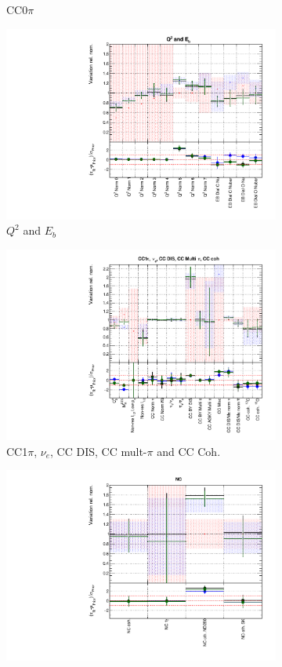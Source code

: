 \begin{figure}[!htbp]
\begin{subfigure}{0.49\textwidth}
  \caption{CC0$\pi$}
\end{subfigure}
\begin{subfigure}{0.49\textwidth}
  \centering
  \includegraphics[width=0.9\linewidth]{figs/polydataxsec_2}
  \caption{$Q^2$ and $E_b$}
\end{subfigure}
\begin{subfigure}{0.49\textwidth}
  \centering
  \includegraphics[width=0.9\linewidth]{figs/polydataxsec_3}
  \caption{CC1$\pi$, $\nu_e$, CC DIS, CC mult-$\pi$ and CC Coh.}
\end{subfigure}
\begin{subfigure}{0.49\textwidth}
  \centering
  \includegraphics[width=0.9\linewidth]{figs/polydataxsec_4}

\end{subfigure}
\end{figure}
